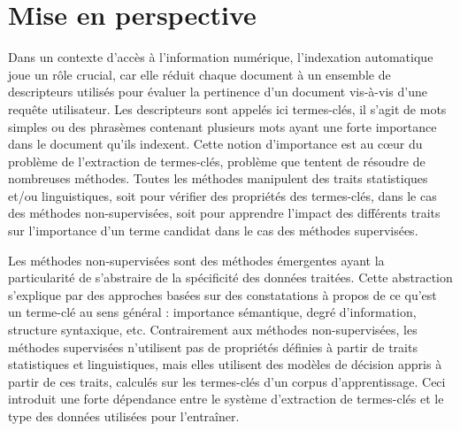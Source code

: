   \section{Mise en perspective}
    Dans un contexte d'accès à l'information numérique, l'indexation automatique
    joue un rôle crucial, car elle réduit chaque document à un ensemble de
    descripteurs utilisés pour évaluer la pertinence d'un document vis-à-vis d'une
    requête utilisateur. Les descripteurs sont appelés ici termes-clés, il s'agit
    de mots simples ou des phrasèmes contenant plusieurs mots ayant une forte
    importance dans le document qu'ils indexent. Cette notion d'importance est au
    c\oe{}ur du problème de l'extraction de termes-clés, problème que tentent de
    résoudre de nombreuses méthodes. Toutes les méthodes manipulent des traits
    statistiques et/ou linguistiques, soit pour vérifier des propriétés des
    termes-clés, dans le cas des méthodes non-supervisées, soit pour apprendre
    l'impact des différents traits sur l'importance d'un terme candidat dans le cas des
    méthodes supervisées.

    Les méthodes non-supervisées sont des méthodes émergentes ayant la
    particularité de s'abstraire de la spécificité des données traitées. Cette
    abstraction s'explique par des approches basées sur des constatations à propos
    de ce qu'est un terme-clé au sens général : importance sémantique, degré
    d'information, structure syntaxique, etc. Contrairement aux méthodes
    non-supervisées, les méthodes supervisées n'utilisent pas de propriétés
    définies à partir de traits statistiques et linguistiques, mais elles
    utilisent des modèles de décision appris à partir de ces traits, calculés sur
    les termes-clés d'un corpus d'apprentissage. Ceci introduit une forte
    dépendance entre le système d'extraction de termes-clés et le type des données
    utilisées pour l'entraîner.

